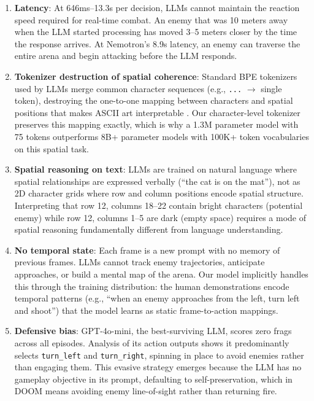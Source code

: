 \documentclass[11pt,a4paper]{article}
\begin{document}
\begin{enumerate}
    \item \textbf{Latency}: At 646ms--13.3s per decision, LLMs cannot maintain the reaction speed required for real-time combat. An enemy that was 10 meters away when the LLM started processing has moved 3--5 meters closer by the time the response arrives. At Nemotron's 8.9s latency, an enemy can traverse the entire arena and begin attacking before the LLM responds.

    \item \textbf{Tokenizer destruction of spatial coherence}: Standard BPE tokenizers used by LLMs merge common character sequences (e.g., \texttt{...} $\rightarrow$ single token), destroying the one-to-one mapping between characters and spatial positions that makes ASCII art interpretable \citep{asciibench2024}. Our character-level tokenizer preserves this mapping exactly, which is why a 1.3M parameter model with 75 tokens outperforms 8B+ parameter models with 100K+ token vocabularies on this spatial task.

    \item \textbf{Spatial reasoning on text}: LLMs are trained on natural language where spatial relationships are expressed verbally (``the cat is on the mat''), not as 2D character grids where row and column positions encode spatial structure. Interpreting that row 12, columns 18--22 contain bright characters (potential enemy) while row 12, columns 1--5 are dark (empty space) requires a mode of spatial reasoning fundamentally different from language understanding.

    \item \textbf{No temporal state}: Each frame is a new prompt with no memory of previous frames. LLMs cannot track enemy trajectories, anticipate approaches, or build a mental map of the arena. Our model implicitly handles this through the training distribution: the human demonstrations encode temporal patterns (e.g., ``when an enemy approaches from the left, turn left and shoot'') that the model learns as static frame-to-action mappings.

    \item \textbf{Defensive bias}: GPT-4o-mini, the best-surviving LLM, scores zero frags across all episodes. Analysis of its action outputs shows it predominantly selects \texttt{turn\_left} and \texttt{turn\_right}, spinning in place to avoid enemies rather than engaging them. This evasive strategy emerges because the LLM has no gameplay objective in its prompt, defaulting to self-preservation, which in DOOM means avoiding enemy line-of-sight rather than returning fire.
\end{enumerate}
\end{document}
